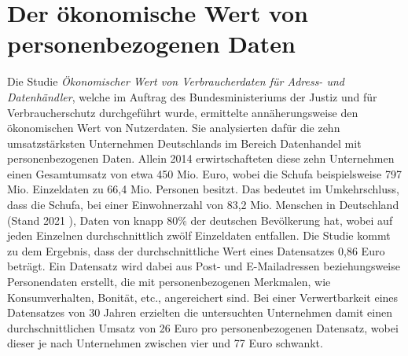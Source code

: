 \section{Der ökonomische Wert von personenbezogenen Daten} \label{oekonomischerWert}

Die Studie \textit{Ökonomischer Wert von Verbraucherdaten für Adress- und Datenhändler}, welche im Auftrag des Bundesministeriums der Justiz und für Verbraucherschutz durchgeführt wurde, ermittelte annäherungsweise den ökonomischen Wert von Nutzerdaten. Sie analysierten dafür die zehn umsatzstärksten Unternehmen Deutschlands im Bereich Datenhandel mit personenbezogenen Daten. Allein 2014 erwirtschafteten diese zehn Unternehmen einen Gesamtumsatz von etwa 450 Mio. Euro, wobei die Schufa beispielsweise 797 Mio. Einzeldaten zu 66,4 Mio. Personen besitzt. Das bedeutet im Umkehrschluss, dass die Schufa, bei einer Einwohnerzahl von 83,2 Mio. Menschen in Deutschland (Stand 2021 \cite{einwohnerzahl_2021}), Daten von knapp 80\% der deutschen Bevölkerung hat, wobei auf jeden Einzelnen durchschnittlich zwölf Einzeldaten entfallen. Die Studie kommt zu dem Ergebnis, dass der durchschnittliche Wert eines Datensatzes 0,86 Euro beträgt. Ein Datensatz wird dabei aus Post- und E-Mailadressen beziehungsweise Personendaten erstellt, die mit personenbezogenen Merkmalen, wie Konsumverhalten, Bonität, etc., angereichert sind. Bei einer Verwertbarkeit eines Datensatzes von 30 Jahren erzielten die untersuchten Unternehmen damit einen durchschnittlichen Umsatz von 26 Euro pro personenbezogenen Datensatz, wobei dieser je nach Unternehmen zwischen vier und 77 Euro schwankt. \cite{Wert_der_Daten_2017}